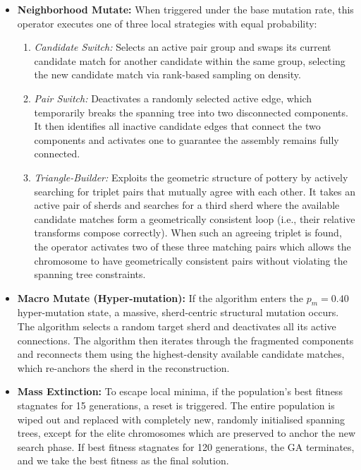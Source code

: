 \documentclass[conference]{IEEEtran}
\begin{document}
\begin{itemize}
\item \textbf{Neighborhood Mutate:} When triggered under the base mutation rate, this operator executes one of three local strategies with equal probability:
\begin{enumerate}
\item \emph{Candidate Switch:} Selects an active pair group and swaps its current candidate match for another candidate within the same group, selecting the new candidate match via rank-based sampling on density.
\item \emph{Pair Switch:} Deactivates a randomly selected active edge, which temporarily breaks the spanning tree into two disconnected components. It then identifies all inactive candidate edges that connect the two components and activates one to guarantee the assembly remains fully connected.
\item \emph{Triangle-Builder:} Exploits the geometric structure of pottery by actively searching for triplet pairs that mutually agree with each other. It takes an active pair of sherds and searches for a third sherd where the available candidate matches form a geometrically consistent loop (i.e., their relative transforms compose correctly). When such an agreeing triplet is found, the operator activates two of these three matching pairs which allows the chromosome to have geometrically consistent pairs without violating the spanning tree constraints.
\end{enumerate}

\item \textbf{Macro Mutate (Hyper-mutation):} If the algorithm enters the $p_m = 0.40$ hyper-mutation state, a massive, sherd-centric structural mutation occurs. The algorithm selects a random target sherd and deactivates all its active connections. The algorithm then iterates through the fragmented components and reconnects them using the highest-density available candidate matches, which re-anchors the sherd in the reconstruction.

\item \textbf{Mass Extinction:} To escape local minima, if the population's best fitness stagnates for 15 generations, a reset is triggered. The entire population is wiped out and replaced with completely new, randomly initialised spanning trees, except for the elite chromosomes which are preserved to anchor the new search phase. If best fitness stagnates for 120 generations, the GA terminates, and we take the best fitness as the final solution.

\end{itemize}
\end{document}
